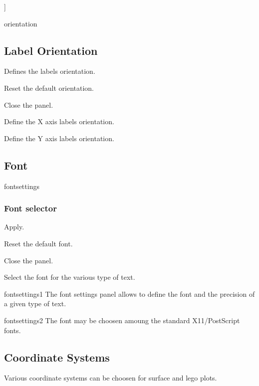 \newpage
]
\begin{PAWf}[.3]{orientation}
\subsection*{Label Orientation}
Defines the labels orientation.

\begin{EnumZB}
\item Reset the default orientation.
\item Close the panel.
\item Define the X axis labels orientation.
\item Define the Y axis labels orientation.
\end{EnumZB}
\end{PAWf}

\subsection{Font}

\begin{PAWf}[.5]{fontsettings}
\subsubsection*{Font selector}

\begin{EnumZB}
\item Apply.
\item Reset the default font.
\item Close the panel.
\item Select the font for the various type of text.
\end{EnumZB}
\end{PAWf}

\newpage

\begin{PAWf}[.5]{fontsettings1}
The font settings panel allows to define the font
and the precision of a given type of text.
\end{PAWf}

\begin{PAWf}[.5]{fontsettings2}
The font may be choosen amoung the standard X11/PostScript
fonts.
\end{PAWf}

\subsection{Coordinate Systems}
Various coordinate systems can be choosen for surface and lego plots.

